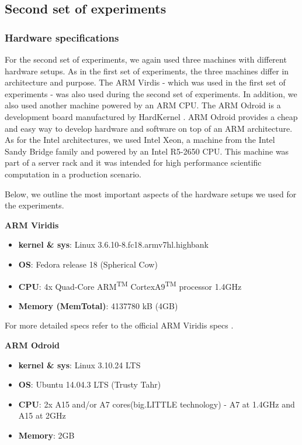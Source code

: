 \subsection{Second set of experiments}

\subsubsection*{Hardware specifications}

For the second set of experiments, we again used three machines with different hardware setups. As in the first set of experiments, the three machines differ in architecture and purpose. The ARM Virdis - which was used in the first set of experiments - was also used during the second set of experiments. In addition, we also used another machine powered by an ARM CPU. The ARM Odroid is a development board manufactured by HardKernel \cite{ODROID_XU3}. ARM Odroid provides a cheap and easy way to develop hardware and software on top of an ARM architecture. As for the Intel architectures, we used Intel Xeon, a machine from the Intel Sandy Bridge family and powered by an Intel R5-2650 CPU. This machine was part of a server rack and it was intended for high performance scientific computation in a production scenario.

Below, we outline the most important aspects of the hardware setups we used for the experiments.

\vspace{10mm}
\textbf{ARM Viridis}
\begin{itemize}
  \item[] \textbf{kernel \& sys}:  Linux  3.6.10-8.fc18.armv7hl.highbank
  \item[] \textbf{OS}: Fedora release 18 (Spherical Cow)
  \item[] \textbf{CPU}:    4x Quad-Core ARM\textsuperscript{TM} CortexA9\textsuperscript{TM} processor \@1.4GHz
  \item[] \textbf{Memory  (MemTotal)}:        4137780 kB (4GB) 
\end{itemize}

For more detailed specs refer to the official ARM Viridis specs \cite{viridis_specs}.


\vspace{10mm}
\textbf{ARM Odroid}
\begin{itemize}
  \item[] \textbf{kernel \& sys}:  Linux 3.10.24 LTS
  \item[] \textbf{OS}: Ubuntu 14.04.3 LTS (Trusty Tahr)
  \item[] \textbf{CPU}: 2x A15 and/or A7 cores(big.LITTLE technology) - A7 at 1.4GHz and A15 at 2GHz
  \item[] \textbf{Memory}:        2GB
\end{itemize}

